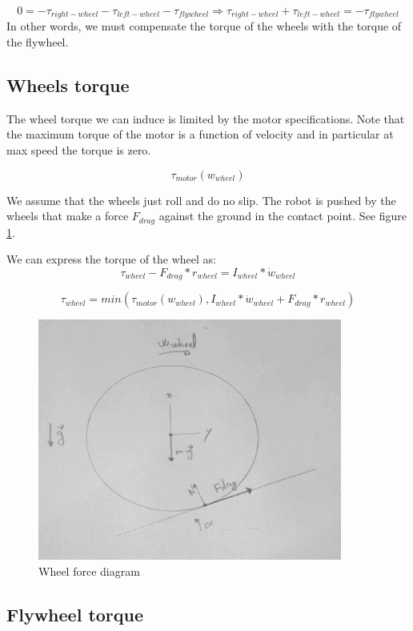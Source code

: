 \begin{equation} \label{eq:control equation}
0 = -\tau_{right-wheel} -\tau_{left-wheel} -\tau_{flywheel} \Rightarrow \tau_{right-wheel} +\tau_{left-wheel} = -\tau_{flywheel}
\end{equation}
In other words, we must compensate the torque of the wheels with the torque of the flywheel.

\subsection{Wheels torque}
The wheel torque we can induce is limited by the motor specifications. Note that the maximum torque of the motor is a function of velocity and in particular at max speed the torque is zero.

\[\tau_{motor} (w_{wheel}) \]


We assume that the wheels just roll and do no slip.
The robot is pushed by the wheels that make a force $F_{drag}$ against the ground in the contact point. See figure \ref{fig:Wheel force diagram}.

We can express the torque of the wheel as:
\[\tau_{wheel} - F_{drag} * r_{wheel} = I_{wheel} * \dot{w}_{wheel} \]

\begin{equation} \label{wheel torque equation}
\tau_{wheel} = min(\tau_{motor} (w_{wheel}),I_{wheel} * \dot{w}_{wheel} + F_{drag} * r_{wheel})
\end{equation}
\begin{figure}[ht]
	\centering
	\includegraphics[width=10cm]{img/wheel_diagram.jpg}
	\caption{Wheel force diagram}
	\label{fig:Wheel force diagram}
\end{figure}


\subsection{Flywheel torque}

